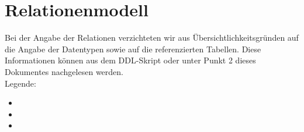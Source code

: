 





\section{Relationenmodell}
Bei der Angabe der Relationen verzichteten wir aus Übersichtlichkeitsgründen auf die Angabe der Datentypen sowie auf die referenzierten Tabellen. Diese Informationen können aus dem DDL-Skript oder unter Punkt 2 dieses Dokumentes nachgelesen werden.\\

Legende:
\begin{itemize}
  \item {}
  \item {}
  \item {}
\end{itemize}

